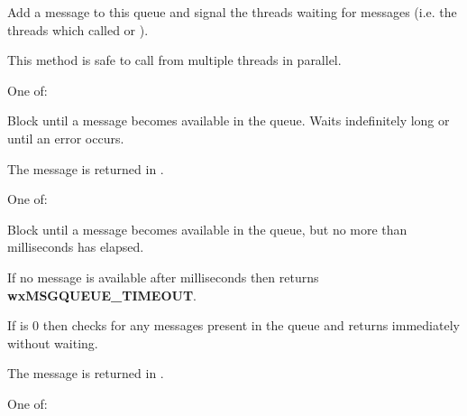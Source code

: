 \label{wxmessagequeuepost}


Add a message to this queue and signal the threads waiting for messages
(i.e. the threads which called  or
).

This method is safe to call from multiple threads in parallel.


One of:

\twocolwidtha{7cm}
\begin{twocollist}\itemsep=0pt
\end{twocollist}


\label{wxmessagequeuereceive}


Block until a message becomes available in the queue. Waits indefinitely long
or until an error occurs.

The message is returned in .


One of:

\twocolwidtha{7cm}
\begin{twocollist}\itemsep=0pt
\end{twocollist}


\label{wxmessagequeuereceivetimeout}


Block until a message becomes available in the queue, but no more than
 milliseconds has elapsed.

If no message is available after  milliseconds then returns
{\bf wxMSGQUEUE\_TIMEOUT}.

If  is $0$ then checks for any messages present in the queue
and returns immediately without waiting.

The message is returned in .


One of:

\twocolwidtha{7cm}
\begin{twocollist}\itemsep=0pt
\end{twocollist}

